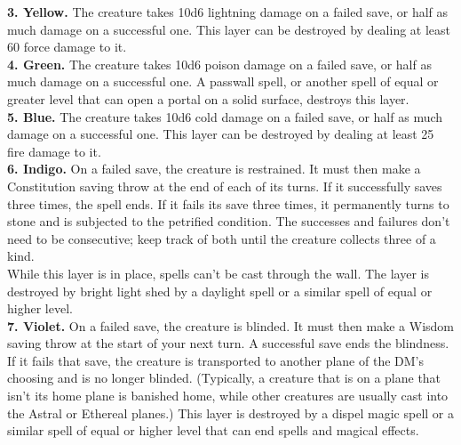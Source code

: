 \documentclass[11pt, A4paper, english]{article}
\begin{document}
\textbf{3. Yellow.} The creature takes 10d6 lightning damage on a failed save, or half as much damage on a successful one. This layer can be destroyed by dealing at least 60 force damage to it. \\
\textbf{4. Green.} The creature takes 10d6 poison damage on a failed save, or half as much damage on a successful one. A passwall spell, or another spell of equal or greater level that can open a portal on a solid surface, destroys this layer. \\
\textbf{5. Blue.} The creature takes 10d6 cold damage on a failed save, or half as much damage on a successful one. This layer can be destroyed by dealing at least 25 fire damage to it. \\
\textbf{6. Indigo.} On a failed save, the creature is restrained. It must then make a Constitution saving throw at the end of each of its turns. If it successfully saves three times, the spell ends. If it fails its save three times, it permanently turns to stone and is subjected to the petrified condition. The successes and failures don’t need to be consecutive; keep track of both until the creature collects three of a kind. \\
While this layer is in place, spells can’t be cast through the wall. The layer is destroyed by bright light shed by a daylight spell or a similar spell of equal or higher level. \\
\textbf{7. Violet.}  On a failed save, the creature is blinded. It must then make a Wisdom saving throw at the start of your next turn. A successful save ends the blindness. If it fails that save, the creature is transported to another plane of the DM’s choosing and is no longer blinded. (Typically, a creature that is on a plane that isn’t its home plane is banished home, while other creatures are usually cast into the Astral or Ethereal planes.) This layer is destroyed by a dispel magic spell or a similar spell of equal or higher level that can end spells and magical effects.
\end{document}
